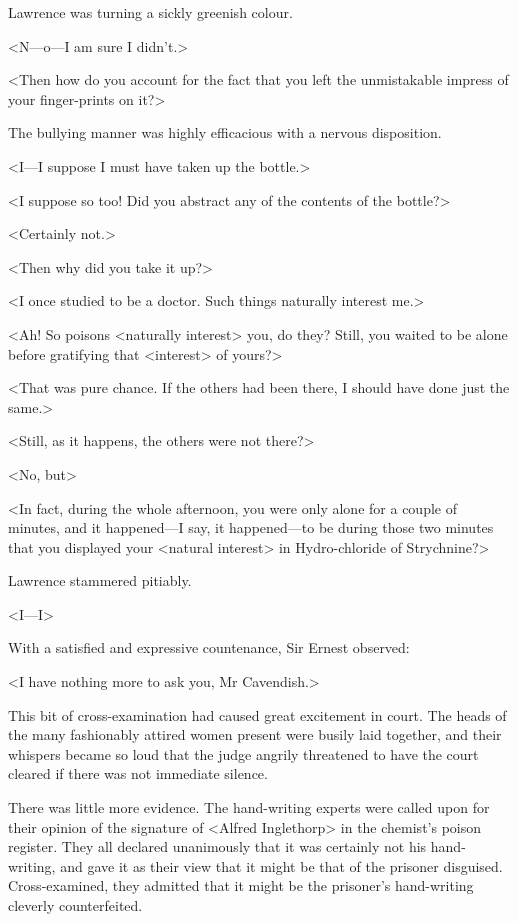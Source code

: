  Lawrence was turning a sickly greenish colour. 

 <N—o—I am sure I didn't.> 

 <Then how do you account for the fact that you left the unmistakable impress of your finger-prints on it?> 

 The bullying manner was highly efficacious with a nervous disposition. 

 <I—I suppose I must have taken up the bottle.> 

 <I suppose so too! Did you abstract any of the contents of the bottle?> 

 <Certainly not.> 

 <Then why did you take it up?> 

 <I once studied to be a doctor. Such things naturally interest me.> 

 <Ah! So poisons <naturally interest> you, do they? Still, you waited to be alone before gratifying that <interest> of yours?> 

 <That was pure chance. If the others had been there, I should have done just the same.> 

 <Still, as it happens, the others were not there?> 

 <No, but\longdash> 

 <In fact, during the whole afternoon, you were only alone for a couple of minutes, and it happened—I say, it happened—to be during those two minutes that you displayed your <natural interest> in Hydro-chloride of Strychnine?> 

 Lawrence stammered pitiably. 

 <I—I\longdash> 

 With a satisfied and expressive countenance, Sir Ernest observed: 

 <I have nothing more to ask you, Mr Cavendish.> 

 This bit of cross-examination had caused great excitement in court. The heads of the many fashionably attired women present were busily laid together, and their whispers became so loud that the judge angrily threatened to have the court cleared if there was not immediate silence. 

 There was little more evidence. The hand-writing experts were called upon for their opinion of the signature of <Alfred Inglethorp> in the chemist's poison register. They all declared unanimously that it was certainly not his hand-writing, and gave it as their view that it might be that of the prisoner disguised. Cross-examined, they admitted that it might be the prisoner's hand-writing cleverly counterfeited. 

